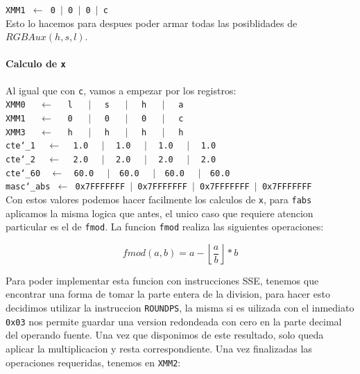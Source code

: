 \noindent
\texttt{XMM1 $\gets$ 0 $\vert$ 0 $\vert$ 0 $\vert$ c}\\

Esto lo hacemos para despues poder armar todas las posiblidades de $RGBAux(h,s,l)$.

\paragraph{Calculo de \texttt{x}\newline}

Al igual que con \texttt{c}, vamos a empezar por los registros:\\

\noindent
\texttt{XMM0 $\ \ \ \ \gets \ \ \ \ $ l $\ \ \ \ \ \vert\ \ \ \ $ s $\ \ \ \ \ \vert\ \ \ \ $ h  $\ \ \ \ \ \vert\ \ \ \ $ a}\\
\texttt{XMM1 $\ \ \ \ \gets \ \ \ \ $ 0 $\ \ \ \ \ \vert\ \ \ \ $ 0 $\ \ \ \ \ \vert\ \ \ \ $ 0  $\ \ \ \ \ \vert\ \ \ \ $ c}\\
\texttt{XMM3 $\ \ \ \ \gets \ \ \ \ $ h $\ \ \ \ \ \vert\ \ \ \ $ h $\ \ \ \ \ \vert\ \ \ \ $ h  $\ \ \ \ \ \vert\ \ \ \ $ h}\\
\texttt{cte\char`_1 $\ \ \ \gets\ \ \ $ 1.0 $\ \ \ \ \vert\ \ \ $ 1.0 $\ \ \ \ \vert\ \ \ $ 1.0 $\ \ \ \ \vert\ \ \ $ 1.0}\\
\texttt{cte\char`_2 $\ \ \ \gets\ \ \ $ 2.0 $\ \ \ \ \vert\ \ \ $ 2.0 $\ \ \ \ \vert\ \ \ $ 2.0 $\ \ \ \ \vert \ \ \ $ 2.0}\\
\texttt{cte\char`_60 $\ \ \gets\ \ $ 60.0 $\ \ \ \ \vert\ \ $ 60.0 $\ \ \ \ \vert\ \ $ 60.0 $\ \ \ \ \vert \ \ $ 60.0}\\
\texttt{masc\char`_abs $\gets$ 0x7FFFFFFF $\vert$ 0x7FFFFFFF $\vert$ 0x7FFFFFFF $\vert$ 0x7FFFFFFF}\\

Con estos valores podemos hacer facilmente los calculos de \texttt{x}, para \texttt{fabs} aplicamos la misma logica que antes, el unico caso que requiere atencion particular es el de \texttt{fmod}. La funcion \texttt{fmod} realiza las siguientes operaciones:

$$
fmod(a, b) = a - \left\lfloor\frac{a}{b}\right\rfloor * b 
$$

Para poder implementar esta funcion con instrucciones SSE, tenemos que encontrar una forma de tomar la parte entera de la division, para hacer esto decidimos utilizar la instruccion \texttt{ROUNDPS}, la misma si es uilizada con el inmediato \texttt{0x03} nos permite guardar una version redondeada con cero en la parte decimal del operando fuente. Una vez que disponimos de este resultado, solo queda aplicar la multiplicacion y resta correspondiente.
Una vez finalizadas las operaciones requeridas, tenemos en \texttt{XMM2}:\\

